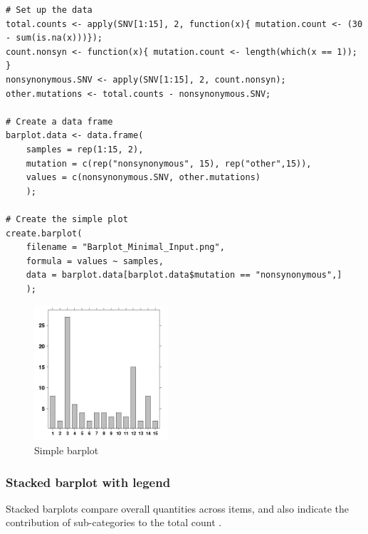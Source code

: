 \documentclass[letterpaper]{article}
\begin{document}
\begin{verbatim}
# Set up the data
total.counts <- apply(SNV[1:15], 2, function(x){ mutation.count <- (30 - sum(is.na(x)))});
count.nonsyn <- function(x){ mutation.count <- length(which(x == 1)); }
nonsynonymous.SNV <- apply(SNV[1:15], 2, count.nonsyn);
other.mutations <- total.counts - nonsynonymous.SNV;

# Create a data frame 
barplot.data <- data.frame(
    samples = rep(1:15, 2),
    mutation = c(rep("nonsynonymous", 15), rep("other",15)),
    values = c(nonsynonymous.SNV, other.mutations)
    );
    
# Create the simple plot
create.barplot(
    filename = "Barplot_Minimal_Input.png",
    formula = values ~ samples,
    data = barplot.data[barplot.data$mutation == "nonsynonymous",]
    );
\end{verbatim}
\begin{figure}[!ht]
  \begin{center}
     \includegraphics[width=50mm]{Figures/Barplot_Minimal_Input.png}
     \caption{Simple barplot}
  \end{center}
\end{figure}


\subsubsection{Stacked barplot with legend}
Stacked barplots compare overall quantities across items, and also indicate the contribution of sub-categories to the total count \cite{streit}.
\end{document}
